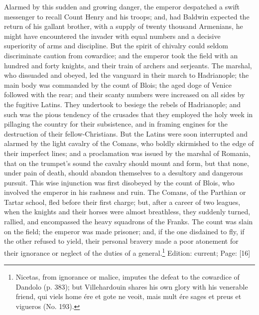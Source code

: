 Alarmed by this sudden and growing danger, the emperor despatched a swift messenger to recall Count Henry and his troops; and, had Baldwin expected the return of his gallant brother, with a supply of twenty thousand Armenians, he might have encountered the invader with equal numbers and a decisive superiority of arms and discipline. But the spirit of chivalry could seldom discriminate caution from cowardice; and the emperor took the field with an hundred and forty knights, and their train of archers and serjeants. The marshal, who dissuaded and obeyed, led the vanguard in their march to Hadrianople; the main body was commanded by the count of Blois; the aged doge of Venice followed with the rear; and their scanty numbers were increased on all sides by the fugitive Latins. They undertook to besiege the rebels of Hadrianople; and such was the pious tendency of the crusades that they employed the holy week in pillaging the country for their subsistence, and in framing engines for the destruction of their fellow-Christians. But the Latins were soon interrupted and alarmed by the light cavalry of the Comans, who boldly skirmished to the edge of their imperfect lines; and a proclamation was issued by the marshal of Romania, that on the trumpet\texthebrew{}’s sound the cavalry should mount and form, but that none, under pain of death, should abandon themselves to a desultory and dangerous pursuit. This wise injunction was first disobeyed by the count of Blois, who involved the emperor in his rashness and ruin. The Comans, of the Parthian or Tartar school, fled before their first charge; but, after a career of two leagues, when the knights and their horses were almost breathless, they suddenly turned, rallied, and encompassed the heavy squadrons of the Franks. The count was slain on the field; the emperor was made prisoner; and, if the one disdained to fly, if the other refused to yield, their personal bravery made a poor atonement for their ignorance or neglect of the duties of a general.\footnote{Nicetas, from ignorance or malice, imputes the defeat to the cowardice of Dandolo (p. 383); but Villehardouin shares his own glory with his venerable friend, qui viels home ére et gote ne veoit, mais mult ére sages et preus et vigueros (No. 193).}
Edition: current; Page: [16]

